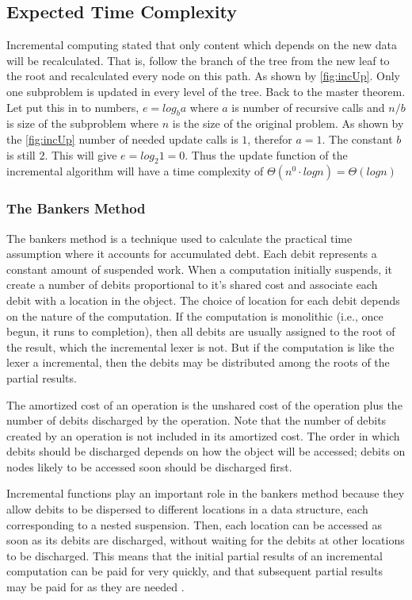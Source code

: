 \subsection{Expected Time Complexity}
Incremental computing stated that only content which depends on the new
data will be recalculated. That is, follow the branch of the tree from the new
leaf to the root and recalculated every node on this path. 
As shown by \cref{fig:incUp}. Only one subproblem is updated in every level of
the tree. Back to the master theorem. Let put this in to numbers, $e = log_b a$
where $a$ is number of recursive calls and $n/b$ is size of the subproblem where
$n$ is the size of the original problem. As shown by the \cref{fig:incUp} number
of needed update calls is $1$, therefor $a = 1$. The constant $b$ is still $2$.
This will give $e = log_2 1 = 0$. Thus the update function of the incremental
algorithm will have a time complexity of
$\Theta(n^0 \cdot log n) = \Theta(log n)$

\subsubsection{The Bankers Method}
The bankers method is a technique used to calculate the practical time
assumption where it accounts for accumulated debt. Each debit represents
a constant amount of suspended work. When a computation initially suspends, it
create a number of debits proportional to it's shared cost and
associate each debit with a location in the object. The choice of location for
each debit depends on the nature of the computation. If the computation is
monolithic (i.e., once begun, it runs to completion), then all debits are
usually assigned to the root of the result, which the incremental lexer is not. 
But if the computation is like the lexer a incremental, then the debits may be 
distributed among the roots of the partial results.

The amortized cost of an operation is the unshared cost of the operation
plus the number of debits discharged by the operation. Note that the number
of debits created by an operation is not included in its amortized cost. The
order in which debits should be discharged depends on how the object will
be accessed; debits on nodes likely to be accessed soon should be discharged
first.

Incremental functions play an important role in the bankers method because
they allow debits to be dispersed to different locations in a data structure,
each corresponding to a nested suspension. Then, each location can be accessed
as soon as its debits are discharged, without waiting for the debits at other
locations to be discharged. This means that the initial partial results of
an incremental computation can be paid for very quickly, and that subsequent
partial results may be paid for as they are needed \cite{Okasaki1999}.

